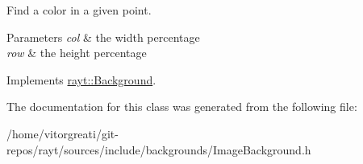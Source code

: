 Find a color in a given point. 


\begin{DoxyParams}{Parameters}
{\em col} & the width percentage \\
\hline
{\em row} & the height percentage \\
\hline
\end{DoxyParams}


Implements \mbox{\hyperlink{classrayt_1_1_background_ada66e69d97dada79872cd7f79326b8cd}{rayt\+::\+Background}}.



The documentation for this class was generated from the following file\+:\begin{DoxyCompactItemize}
\item 
/home/vitorgreati/git-\/repos/rayt/sources/include/backgrounds/Image\+Background.\+h\end{DoxyCompactItemize}
